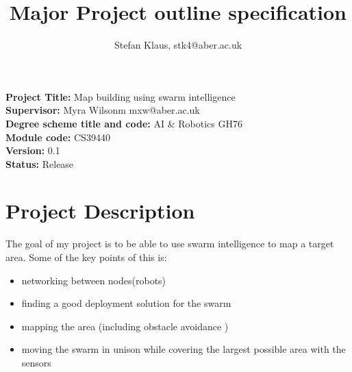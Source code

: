 \documentclass[10pt,a4paper]{article}
\author{Stefan Klaus, stk4@aber.ac.uk}
\title{Major Project outline specification }
\begin{document}
\maketitle
\begin{flushleft}
\textbf{Project Title:} Map building using swarm intelligence \\[3ex]
\textbf{Supervisor:} Myra Wilsonm mxw@aber.ac.uk\\[3ex]
\textbf{Degree scheme title and code:} AI \& Robotics GH76\\[3ex]
\textbf{Module code:} CS39440\\[3ex]
\textbf{Version:} 0.1\\[3ex]
\textbf{Status:} Release\\
\newpage
\section{Project Description }
The goal of my project is to be able to use swarm intelligence to map a target area. Some of the key points of this is:
\begin{itemize}
\item networking between nodes(robots)
\item finding a good deployment solution for the swarm
\item mapping the area (including obstacle avoidance )
\item moving the swarm in unison while covering the largest possible area with the sensors
 

\end{itemize}
\end{flushleft}
\end{document}
